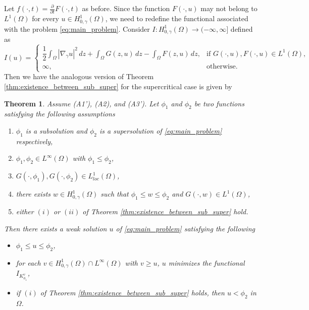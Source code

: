 \documentclass[11pt]{article}
\newtheorem{theorem}{Theorem}[section] %
\newcommand{\om} {\Omega}
\newcommand{\gradgr}{\nabla_{\gamma}}
\newcommand{\spacegr}{H^{1}_{0,\gamma}(\Omega)}
\begin{document}
Let $f(\cdot,t) = \frac{\partial}{\partial t} F(\cdot, t)$ as before. Since the function $F(\cdot, u)$ may not belong to $L^1(\om)$ for every $u \in \spacegr$, we need to redefine the functional associated with the problem \eqref{eq:main_problem}. Consider $I : \spacegr \to (-\infty , \infty ]$ defined as 
\begin{equation*}
I(u) =
\begin{cases}
\dfrac{1}{2} \displaystyle\int_{\Omega} |\gradgr u|^{2}\,dz
+ \displaystyle\int_{\Omega} G(z,u)\,dz
- \displaystyle\int_{\Omega} F(z,u)\,dz,
& \text{if } G(\cdot,u), F(\cdot,u) \in L^{1}(\Omega), \\[1.2ex]
\infty, & \text{otherwise}.
\end{cases}
\end{equation*}
Then we have the analogous version of Theorem \ref{thm:existence_between_sub_super} for the supercritical case is given by
\begin{theorem}
\label{thm:local_minimizer_from_supersolution_supercritical}
Assume (A1'), (A2), and (A3'). Let $\phi_1$ and $\phi_2$ be two functions satisfying the following assumptions
\begin{enumerate}
    \item[$(i)$] $\phi_1$ is a subsolution and $\phi_2$ is a supersolution of \eqref{eq:main_problem} respectively,
    \item[$(ii)$] $\phi_1, \phi_2 \in L^{\infty}(\om)$ with $\phi_1 \leq \phi_2$,
    \item[$(iii)$] $G(\cdot, \phi_1), G(\cdot, \phi_2) \in L_{loc}^1(\om)$,
    \item[$(iv)$] there exists $w \in \spacegr$ such that $\phi_1 \leq w \leq \phi_2$ and $G(\cdot, w) \in L^1(\om)$,
    \item[$(v)$] either $(i)$ or $(ii)$ of Theorem \ref{thm:existence_between_sub_super} hold.
\end{enumerate}
Then there exists a weak solution $u$ of \eqref{eq:main_problem} satisfying the following 
\begin{itemize}
    \item $\phi_1 \leq u \leq \phi_2$,
    \item for each $v \in \spacegr \cap L^{\infty}(\om)$ with $v \geq u$, $u$ minimizes the functional $I_{K_{\phi_1}^v}$,
    \item if $(i)$ of Theorem \ref{thm:existence_between_sub_super} holds, then $u < \phi_2$ in $\om$.
\end{itemize}
\end{theorem}
\end{document}
